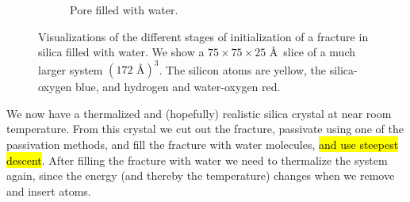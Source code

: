 \begin{figure}[htpb]
\begin{subfigure}[t]{\myfigwidth}
        \caption{%
            Pore filled with water.%
            \label{fig:initialization_step05}%
        }%
        \hspace{8pt}
    \end{subfigure}%
    \captionsetup{width=\textwidth}%
    \caption{%
        Visualizations of the different stages of initialization of a fracture in silica filled with water. We show a $75\times 75\times 25$ \AA\ slice of a much larger system $(172 \text{ \AA})^3$. The silicon atoms are yellow, the silica-oxygen blue, and hydrogen and water-oxygen red. %
        \label{fig:initialization_steps}%
    }%
\end{figure}%

We now have a thermalized and (hopefully) realistic silica crystal at near room temperature. From this crystal we cut out the fracture, passivate using one of the passivation methods, and fill the fracture with water molecules, \hl{and use steepest descent}. After filling the fracture with water we need to thermalize the system again, since the energy (and thereby the temperature) changes when we remove and insert atoms.